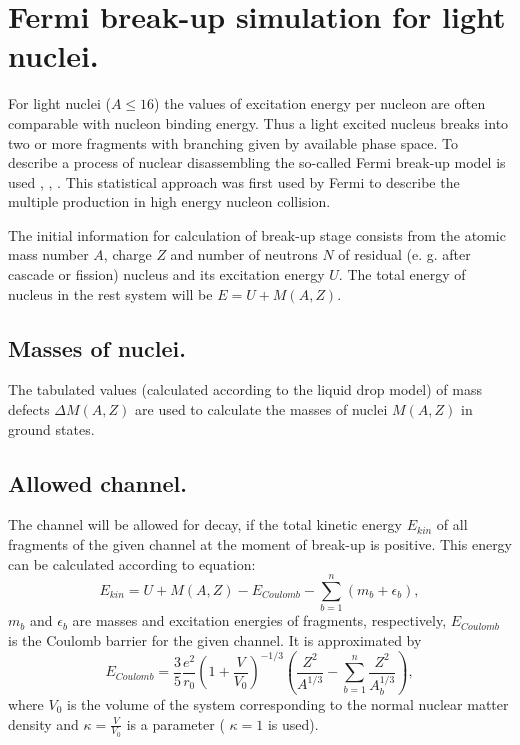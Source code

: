 \section{Fermi break-up simulation for light nuclei.}

\hspace{1.0em}For light nuclei ($A \leq 16$) the values of excitation
energy per nucleon are often comparable with nucleon binding
energy. Thus a light excited nucleus breaks into two or more fragments
with branching given by available phase space.  To describe a process of
nuclear disassembling the so-called Fermi break-up model is used
\cite{Fermi50}, \cite{Kretz61}, \cite{EG67}.  This statistical approach
was first used by Fermi \cite{Fermi50} to describe the multiple
production in high energy nucleon collision.

The initial information for calculation of break-up stage consists from
the atomic mass number $A$, charge $Z$ and number of neutrons $N$ of
residual (e. g. after cascade or fission) nucleus and its excitation
energy $U$. The total energy of nucleus in the rest system will be
$E=U+M(A,Z)$.

\subsection{Masses of nuclei.} 

\hspace{1.0em}The tabulated values (calculated according to the liquid drop
model) \cite{CAM57} of mass defects  $\Delta M(A,Z)$
are used to calculate the masses of nuclei $M(A,Z)$ in ground states.

\subsection{ Allowed channel.} 

\hspace{1.0em}The channel will be allowed for decay, if the total
kinetic energy $E_{kin}$ of all fragments of the given channel at the
moment of break-up is positive. This energy can be calculated according
to equation:
\begin{equation}
\label{FBS1}E_{kin} = U+M(A,Z)-E_{Coulomb} - \sum_{b=1}^{n}(m_b+\epsilon_{b}),
\end{equation} 
$m_{b}$ and $\epsilon_{b}$ are masses and excitation energies of fragments, 
respectively, $E_{Coulomb}$ is the Coulomb barrier for the given channel. It 
is approximated by
\begin{equation}
\label{FBS2}E_{Coulomb} = \frac{3}{5} \frac{e^2}{r_{0}}(1 + 
\frac{V}{V_{0}})^{-1/3}
(\frac{Z^2}{A^{1/3}}-\sum_{b=1}^{n}\frac{Z^2}{A_b^{1/3}}),
\end{equation}
where $V_0$ is the volume of the system corresponding to the normal
nuclear matter density and $\kappa = \frac{V}{V_0}$ is a parameter (
$\kappa = 1$ is used).

